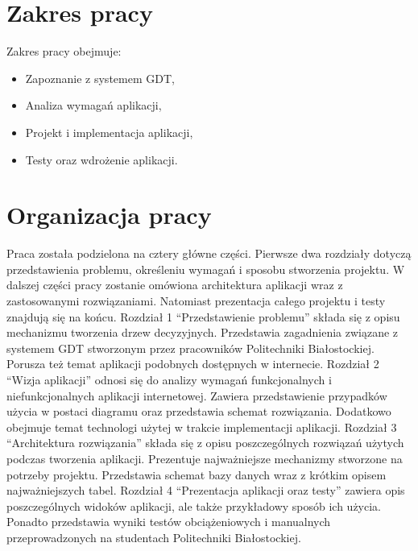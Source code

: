 \section*{Zakres pracy}
Zakres pracy obejmuje: 

\begin{itemize}
\item Zapoznanie z systemem GDT,
\item Analiza wymagań aplikacji,
\item Projekt i implementacja aplikacji, 
\item Testy oraz wdrożenie aplikacji.
\end{itemize}


\section*{Organizacja pracy}
Praca została podzielona na cztery główne części. Pierwsze dwa rozdziały dotyczą przedstawienia problemu, określeniu wymagań i sposobu stworzenia projektu. W dalszej części pracy zostanie omówiona architektura aplikacji wraz z zastosowanymi rozwiązaniami. Natomiast prezentacja całego projektu i testy znajdują się na końcu. 
Rozdział 1 \enquote{Przedstawienie problemu} składa się z opisu mechanizmu tworzenia drzew decyzyjnych. Przedstawia zagadnienia związane z systemem GDT stworzonym przez pracowników Politechniki Białostockiej. Porusza też temat aplikacji podobnych dostępnych w internecie.
Rozdział 2 \enquote{Wizja aplikacji} odnosi się do analizy wymagań funkcjonalnych i niefunkcjonalnych aplikacji internetowej. Zawiera przedstawienie przypadków użycia w postaci diagramu oraz przedstawia schemat rozwiązania. Dodatkowo obejmuje temat technologi użytej w trakcie implementacji aplikacji.
Rozdział 3 \enquote{Architektura rozwiązania} składa się z opisu poszczególnych rozwiązań użytych podczas tworzenia aplikacji. Prezentuje najważniejsze mechanizmy stworzone na potrzeby projektu. Przedstawia schemat bazy danych wraz z krótkim opisem najważniejszych tabel.
Rozdział 4 \enquote{Prezentacja aplikacji oraz testy} zawiera opis poszczególnych widoków aplikacji, ale także przykładowy sposób ich użycia. Ponadto przedstawia wyniki testów obciążeniowych i manualnych przeprowadzonych na studentach Politechniki Białostockiej.